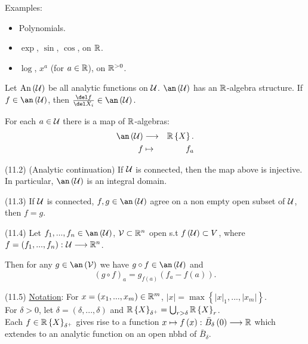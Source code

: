 Examples:
\begin{itemize}
\item Polynomials.
\item $\exp$, $\sin$, $\cos$, on $\mathbb{R}$.
\item $\log$, $x^{a}$ (for $a\in\mathbb{R}$), on $\mathbb{R}^{>0}$.
\end{itemize}
Let $\mathrm{An}\left(\mathcal{U}\right)$ be all analytic functions on $\mathcal{U}$.
$\an\left(\u\right)$ has an $\mathbb{R}$-algebra structure. If $f\in\an\left(\u\right)$,
then $\frac{\del f}{\del X_{i}}\in\an\left(\u\right).$

For each $a\in\mathcal{U}$ there is a map of $\mathbb{R}$-algebras:
\begin{eqnarray*}
\an\left(\u\right) & \lto & \R\left\{ X\right\} .\\
f & \mapsto & f_{a}
\end{eqnarray*}

\begin{prop*}
(11.2) (Analytic continuation) If $\mathcal{U}$ is connected, then the map
above is injective. In particular, $\an\left(\u\right)$ is an integral
domain.\end{prop*}
\begin{cor*}
(11.3) If $\mathcal{U}$ is connected, $f,g\in\an\left(\u\right)$ agree on
a non empty open subset of $\mathcal{U}$, then $f=g$.\end{cor*}
\begin{prop*}
(11.4) Let $f_{1},...,f_{n}\in\an\left(\u\right)$, $\mathcal{V}\subset\mathbb{R}^{n}$
open s.t $f\left(\mathcal{U}\right)\subset V$, where $f=\left(f_{1},...,f_{n}\right)\colon\mathcal{U}\longrightarrow\mathbb{R}^{n}$.

Then for any $g\in\an\left(\v\right)$ we have $g\circ f\in\an\left(\u\right)$
and 
\[
\left(g\circ f\right)_{a}=g_{f\left(a\right)}\left(f_{a}-f\left(a\right)\right).
\]

\end{prop*}
(11.5) \uline{Notation}: For $x=\left(x_{1},...,x_{m}\right)\in\mathbb{R}^{m}$,
$\left|x\right|=\max\left\{ \left|x\right|_{1},...,\left|x_{m}\right|\right\} $.
\\
For $\delta>0$, let $\delta=\left(\delta,...,\delta\right)$ and
$\mathbb{R}\left\{ X\right\} _{\delta^{+}}=\bigcup_{r>\delta}\mathbb{R}\left\{ X\right\} _{r}$.\\
Each $f\in\mathbb{R}\left\{ X\right\} _{\delta^{+}}$ gives rise to a function
$x\mapsto f\left(x\right)\colon\bar{B}_{\delta}\left(0\right)\longrightarrow\mathbb{R}$
which extendes to an analytic function on an open nbhd of $\bar{B}_{\delta}$.

